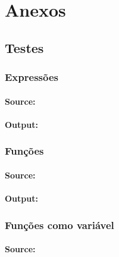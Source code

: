 \chapter{Anexos}


\flushbottom
\section{Testes}
\lstset{language=Pascal,
extendedchars=\true,
inputencoding=utf8x}
{
\fontsize{9pt}{9}\selectfont
\subsection*{Expressões}
\subsubsection*{Source:}

\subsubsection*{Output:}


\subsection*{Funções}
\subsubsection*{Source:}

\subsubsection*{Output:}


\subsection*{Funções como variável}
\subsubsection*{Source:}

}

